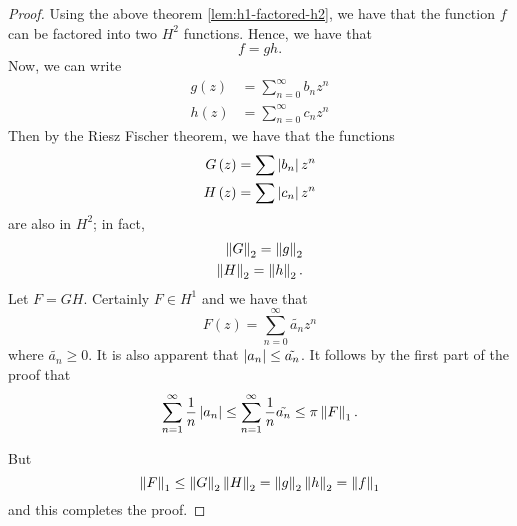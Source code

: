 \begin{proof}
    Using the above theorem \ref{lem:h1-factored-h2}, we have that the function $f$ can be factored into two $H^{2}$ functions. Hence, we have that 
    \begin{equation*}
	f=gh.
    \end{equation*}
    Now, we can write 
    \begin{align*}
	g\left( z \right) &= \sum_{n=0}^{\infty} b_{n} z^{n} \\
	h\left( z \right) &= \sum_{n=0}^{\infty} c_{n} z^{n}
    \end{align*}
    Then by the Riesz Fischer theorem, we have that the functions
    \begin{align*}
	G\left( z \right)  = \sum \left\lvert b_{n} \right\rvert z^{n} \\
	H\left( z \right) = \sum \left\lvert c_{n} \right\rvert z^{n}
    \end{align*}
    are also in $H^{2}$; in fact, 
    \begin{align*}
	\left\lVert G \right\rVert_{2} = \left\lVert g \right\rVert_{2} \\
	\left\lVert H \right\rVert_{2} = \left\lVert h \right\rVert_{2}.
    \end{align*}
    Let $F=GH$. Certainly $F\in H^{1}$ and we have that 
    \begin{equation*}
	F\left( z \right) = \sum_{n=0}^{\infty} \tilde{a_{n}} z^{n}
    \end{equation*}
    where $\tilde{a_{n}}\ge 0$. It is also apparent that $\left\lvert a_{n} \right\rvert \le \tilde{a_{n}}$. It follows by the first part of the proof that 
    \begin{equation*}
	\sum_{n=1}^{\infty} \frac{1}{n} \left\lvert a_{n} \right\rvert \le \sum_{n=1}^{\infty} \frac{1}{n} \tilde{a_{n}} \le \pi \left\lVert F \right\rVert_{1}.
    \end{equation*}

    But
    \begin{equation*}
	\left\lVert F \right\rVert_{1} \le \left\lVert G \right\rVert_{2} \left\lVert H \right\rVert_{2} = \left\lVert g \right\rVert_{2} \left\lVert h \right\rVert_{2} = \left\lVert f \right\rVert_{1}
    \end{equation*}
    and this completes the proof.
\end{proof}

